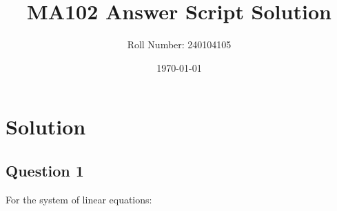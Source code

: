 \documentclass[12pt]{article}
\title{MA102 Answer Script Solution}
\author{Roll Number: 240104105}
\date{\today}
\begin{document}
\maketitle
\section*{Solution}

\subsection*{Question 1}

For the system of linear equations:
\end{document}
